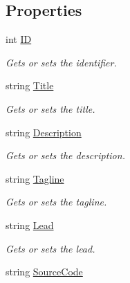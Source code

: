 \subsection*{Properties}
\begin{DoxyCompactItemize}
\item 
int \hyperlink{class_open_1_1_g_i_1_1hypermart_1_1_models_1_1_product_a4fedd3f62a9c36939c6e45ea2e8cd011}{I\+D}
\begin{DoxyCompactList}\small\item\em Gets or sets the identifier. \end{DoxyCompactList}\item 
string \hyperlink{class_open_1_1_g_i_1_1hypermart_1_1_models_1_1_product_a877241a61c423e91b6b630df5ca811d0}{Title}
\begin{DoxyCompactList}\small\item\em Gets or sets the title. \end{DoxyCompactList}\item 
string \hyperlink{class_open_1_1_g_i_1_1hypermart_1_1_models_1_1_product_a8d7cb8cd22f77fa66f06726400b1381e}{Description}
\begin{DoxyCompactList}\small\item\em Gets or sets the description. \end{DoxyCompactList}\item 
string \hyperlink{class_open_1_1_g_i_1_1hypermart_1_1_models_1_1_product_ad0233eb35ac4048277a4eafde6432c43}{Tagline}
\begin{DoxyCompactList}\small\item\em Gets or sets the tagline. \end{DoxyCompactList}\item 
string \hyperlink{class_open_1_1_g_i_1_1hypermart_1_1_models_1_1_product_a646bc5e183ba8d87c06d290398e6bee6}{Lead}
\begin{DoxyCompactList}\small\item\em Gets or sets the lead. \end{DoxyCompactList}\item 
string \hyperlink{class_open_1_1_g_i_1_1hypermart_1_1_models_1_1_product_ab5fd5620220d0e68053208859137a6cb}{Source\+Code}

\end{DoxyCompactItemize}
